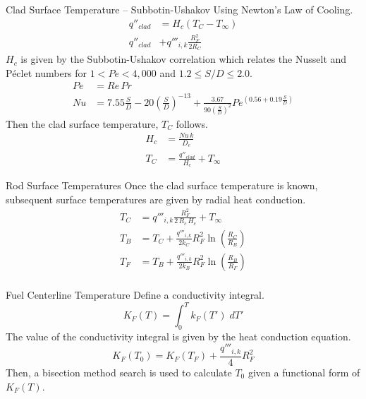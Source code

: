 \begin{frame}{Clad Surface Temperature -- Subbotin-Ushakov}
  Using Newton's Law of Cooling.
  \begin{align}
    q''_{clad} &= H_c (T_C - T_{\infty}) \\
    q''_{clad} &+ q'''_{i,k} \frac{R_F^2}{2 R_C}
  \end{align}
  $H_c$ is given by the Subbotin-Ushakov correlation \cite{subbotinUshakov}
  which relates the Nusselt and P\'eclet numbers for ${1 < Pe < 4,000}$ and 
  ${ 1.2 \le S/D \le 2.0 }$.
  \begin{align}
    Pe &= Re \, Pr \\
    \label{eq:subbotinUshakov}
    Nu &= 7.55 \frac{S}{D} - 20 \left(\frac{S}{D}\right)^{-13} + 
      \frac{3.67}{90\left(\frac{S}{D}\right)^{2}}
      Pe^{\left(0.56 + 0.19 \frac{S}{D}\right)}
  \end{align}
  Then the clad surface temperature, $T_C$ follows.
  \begin{align}
    H_c &= \frac{N\!u \, k}{D_e} \\
    T_C &= \frac{q''_{clad}}{H_c} + T_{\infty}
  \end{align}
\end{frame}

\begin{frame}{Rod Surface Temperatures}
  Once the clad surface temperature is known, subsequent surface temperatures
  are given by radial heat conduction.
  \begin{align}
    \label{eq:tc_forward}
    T_C &= q'''_{i,k} \frac{R_F^2}{2\,R_c\,H_c} + T_{\infty} \\
    \label{eq:tb_forward}
    T_B &= T_C + \frac{q'''_{i,k}}{2 k_C} R_F^2
      \ln\left(\frac{R_C}{R_B}\right) \\
    \label{eq:tf_forward}
    T_F &= T_B + \frac{q'''_{i,k}}{2 k_B} R_F^2 
      \ln\left(\frac{R_B}{R_F}\right) \\
  \end{align}
\end{frame}

\begin{frame}{Fuel Centerline Temperature}
  Define a conductivity integral.
  \begin{equation}
    \label{eq:conductivity_integral}
    K_F(T) = \int_0^T k_F(T') \; dT'
  \end{equation}
  The value of the conductivity integral is given by the heat conduction
  equation.
  \begin{equation}
    \label{eq:tcl_conductivity_integral}
    K_F(T_0) = K_F(T_F) + \frac{q'''_{i,k}}{4} R_F^2
  \end{equation}
  Then, a bisection method search is used to calculate $T_0$ given a functional
  form of $K_F(T)$.
\end{frame}

